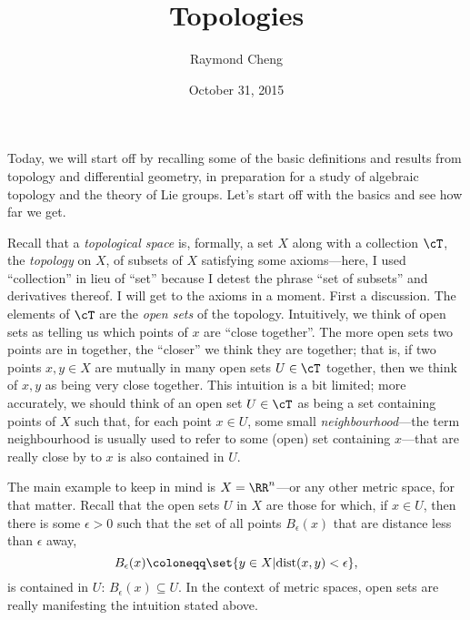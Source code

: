 \documentclass{axolotl}
\title{Topologies}
\author{Raymond Cheng}
\date{October 31, 2015}
\begin{document}
\maketitle
Today, we will start off by recalling some of the basic definitions and results
from topology and differential geometry, in preparation for a study of
algebraic topology and the theory of Lie groups. Let's start off with the
basics and see how far we get.

\label{10-31.1}
Recall that a \textit{topological space} is, formally, a set \(X\) along with a
collection \(\cT\), the \textit{topology} on \(X\), of subsets of \(X\)
satisfying some axioms---here, I used ``collection'' in lieu of ``set'' because
I detest the phrase ``set of subsets'' and derivatives thereof. I will get to
the axioms in a moment. First a discussion. The elements of \(\cT\) are the
\textit{open sets} of the topology. Intuitively, we think of open sets as
telling us which points of \(x\) are ``close together''. The more open sets two
points are in together, the ``closer'' we think they are together; that is, if
two points \(x,y \in X\) are mutually in many open sets \(U \in \cT\) together,
then we think of \(x,y\) as being very close together. This intuition is a bit
limited; more accurately, we should think of an open set \(U \in \cT\) as being
a set containing points of \(X\) such that, for each point \(x \in U\), some
small \textit{neighbourhood}---the term neighbourhood is usually used to refer
to some (open) set containing \(x\)---that are really close by to \(x\) is also
contained in \(U\).

The main example to keep in mind is \(X = \RR^n\)---or any other metric space,
for that matter. Recall that the open sets \(U\) in \(X\) are those for which,
if \(x \in U\), then there is some \(\epsilon > 0\) such that the set of all
points \(B_\epsilon(x)\) that are distance less than \(\epsilon\) away, \[
  B_\epsilon(x) \coloneqq \set{y \in X | \mathrm{dist}(x,y) < \epsilon}, \] is
contained in \(U\): \(B_\epsilon(x) \subseteq U\). In the context of metric
spaces, open sets are really manifesting the intuition stated above.
\end{document}
